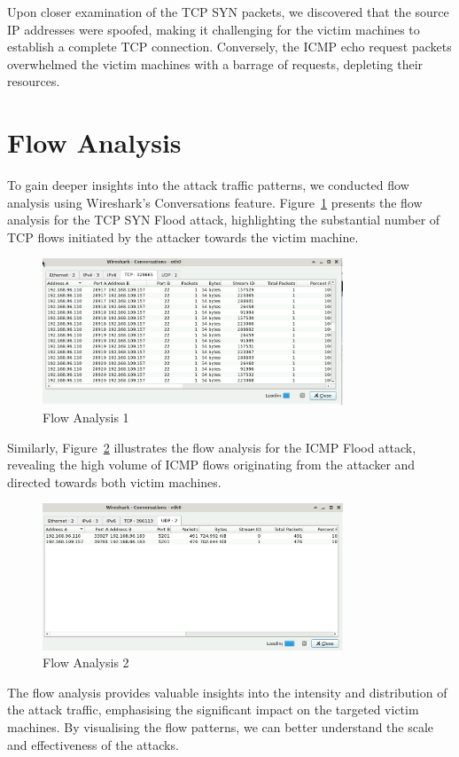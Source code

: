 Upon closer examination of the TCP SYN packets, we discovered that the source IP addresses were spoofed, making it challenging for the victim machines to establish a complete TCP connection. Conversely, the ICMP echo request packets overwhelmed the victim machines with a barrage of requests, depleting their resources.

\section{Flow Analysis}
To gain deeper insights into the attack traffic patterns, we conducted flow analysis using Wireshark's Conversations feature. Figure~\ref{fig:FlowAnalysis1} presents the flow analysis for the TCP SYN Flood attack, highlighting the substantial number of TCP flows initiated by the attacker towards the victim machine.

\begin{figure}[H]
\centering
\includegraphics[width=0.8\textwidth]{img/level3/level3-flow-analysis1.png}
\caption{Flow Analysis 1}\label{fig:FlowAnalysis1}
\end{figure}

Similarly, Figure~\ref{fig:FlowAnalysis2} illustrates the flow analysis for the ICMP Flood attack, revealing the high volume of ICMP flows originating from the attacker and directed towards both victim machines.

\begin{figure}[H]
\centering
\includegraphics[width=0.8\textwidth]{img/level3/level3-flow-analysis2.png}
\caption{Flow Analysis 2}\label{fig:FlowAnalysis2}
\end{figure}

The flow analysis provides valuable insights into the intensity and distribution of the attack traffic, emphasising the significant impact on the targeted victim machines. By visualising the flow patterns, we can better understand the scale and effectiveness of the attacks.